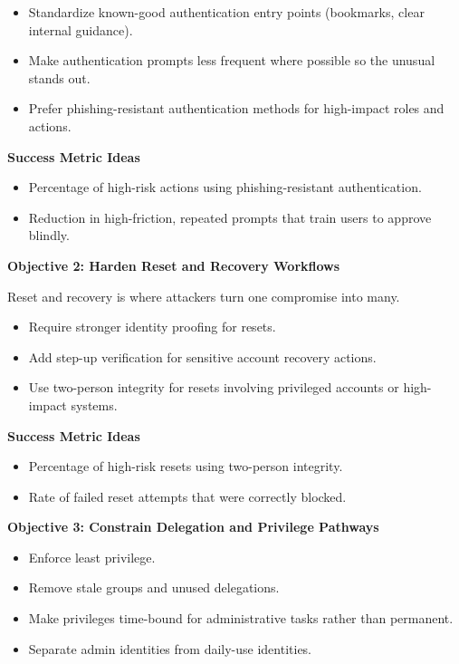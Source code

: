 \documentclass[11pt]{article}
\begin{document}
\begin{itemize}[leftmargin=1.5em]
    \item Standardize known-good authentication entry points (bookmarks, clear internal guidance).
    \item Make authentication prompts less frequent where possible so the unusual stands out.
    \item Prefer phishing-resistant authentication methods for high-impact roles and actions.
\end{itemize}

\textbf{Success Metric Ideas}

\begin{itemize}[leftmargin=1.5em]
    \item Percentage of high-risk actions using phishing-resistant authentication.
    \item Reduction in high-friction, repeated prompts that train users to approve blindly.
\end{itemize}

\textbf{Objective 2: Harden Reset and Recovery Workflows}

Reset and recovery is where attackers turn one compromise into many.

\begin{itemize}[leftmargin=1.5em]
    \item Require stronger identity proofing for resets.
    \item Add step-up verification for sensitive account recovery actions.
    \item Use two-person integrity for resets involving privileged accounts or high-impact systems.
\end{itemize}

\textbf{Success Metric Ideas}

\begin{itemize}[leftmargin=1.5em]
    \item Percentage of high-risk resets using two-person integrity.
    \item Rate of failed reset attempts that were correctly blocked.
\end{itemize}

\textbf{Objective 3: Constrain Delegation and Privilege Pathways}

\begin{itemize}[leftmargin=1.5em]
    \item Enforce least privilege.
    \item Remove stale groups and unused delegations.
    \item Make privileges time-bound for administrative tasks rather than permanent.
    \item Separate admin identities from daily-use identities.
\end{itemize}
\end{document}
